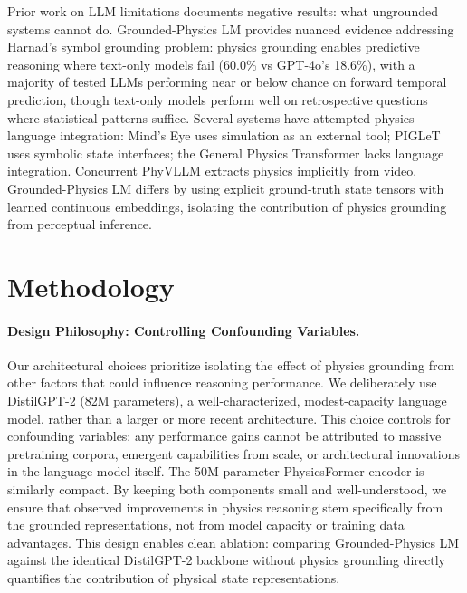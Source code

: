 \documentclass[conference]{IEEEtran}
\theoremstyle{plain}
\theoremstyle{definition}
\theoremstyle{remark}
\begin{document}
Prior work on LLM limitations \cite{wicke2024exploring,feng2025embodied} documents negative results: what ungrounded systems cannot do. Grounded-Physics LM provides nuanced evidence addressing Harnad's symbol grounding problem: physics grounding enables predictive reasoning where text-only models fail (60.0\% vs GPT-4o's 18.6\%), with a majority of tested LLMs performing near or below chance on forward temporal prediction, though text-only models perform well on retrospective questions where statistical patterns suffice. Several systems have attempted physics-language integration: Mind's Eye \cite{liu2022minds} uses simulation as an external tool; PIGLeT \cite{zellers2021piglet} uses symbolic state interfaces; the General Physics Transformer \cite{wiesner2025gphyt} lacks language integration. Concurrent PhyVLLM \cite{zhan2025phyvllm} extracts physics implicitly from video. Grounded-Physics LM differs by using explicit ground-truth state tensors with learned continuous embeddings, isolating the contribution of physics grounding from perceptual inference.



\section{Methodology}
\label{sec:method}

\paragraph{Design Philosophy: Controlling Confounding Variables.} Our architectural choices prioritize isolating the effect of physics grounding from other factors that could influence reasoning performance. We deliberately use DistilGPT-2 (82M parameters), a well-characterized, modest-capacity language model, rather than a larger or more recent architecture. This choice controls for confounding variables: any performance gains cannot be attributed to massive pretraining corpora, emergent capabilities from scale, or architectural innovations in the language model itself. The 50M-parameter PhysicsFormer encoder is similarly compact. By keeping both components small and well-understood, we ensure that observed improvements in physics reasoning stem specifically from the grounded representations, not from model capacity or training data advantages. This design enables clean ablation: comparing Grounded-Physics LM against the identical DistilGPT-2 backbone without physics grounding directly quantifies the contribution of physical state representations.
\end{document}
